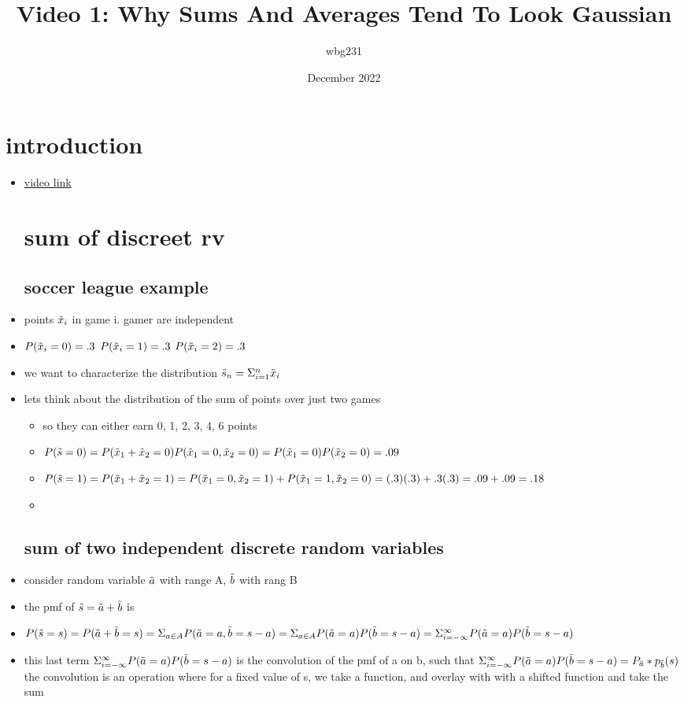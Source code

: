 \documentclass{article}
\title{Video 1: Why Sums And Averages Tend To Look Gaussian}
\author{wbg231 }
\date{December 2022}
\begin{document}
\maketitle

\section{introduction}
\begin{itemize}
\item \href{https://www.youtube.com/watch?v=-fBN9z6uc_E&list=PLBEf5mJtE6KuZ5NBQMuWIMsiOOrV9ibzm&index=70}{video link}
\section{sum of discreet rv}
\subsection{soccer league example}
\item points $\Tilde{x}_i$ in game i. gamer are independent 
\item $P(\Tilde{x}_i=0)=.3$ $P(\Tilde{x}_i=1)=.3$ $P(\Tilde{x}_i=2)=.3$
\item we want to characterize the distribution $\Tilde{s}_{n}=\Sigma_{i=1}^{n}\Tilde{x}_i$
\item lets think about the distribution of the sum of points over just two games
\begin{itemize}
    \item  so they can either earn 0, 1, 2, 3, 4, 6 points
    \item $P(\Tilde{s}=0)=P(\Tilde{x}_1+\Tilde{x}_2=0)P(\Tilde{x}_1=0,\Tilde{x}_2=0)=P(\Tilde{x}_1=0)P(\Tilde{x}_2=0)=.09$
    \item $P(\Tilde{s}=1)=P(\Tilde{x}_{1}+\Tilde{x}_{2}=1)=P(\Tilde{x}_1=0, \Tilde{x}_2=1)+P(\Tilde{x}_1=1, \Tilde{x}_2=0)=(.3)(.3)+.3(.3)=.09+.09=.18$
    \item 
\end{itemize}
\subsection{sum of two independent discrete random variables}
\item consider random variable $\Tilde{a}$ with range A, $\Tilde{b}$ with rang B
\item the pmf of $\Tilde{s}=\Tilde{a}+\Tilde{b}$ is 
\item $P(\Tilde{s}=s)=P(\Tilde{a}+\Tilde{b}=s)=\Sigma_{a\in A}P(\Tilde{a}=a,\Tilde{b}=s-a)=\Sigma_{a\in A}P(\Tilde{a}=a)P(\Tilde{b}=s-a)=\Sigma_{i=-\infty}^{\infty}P(\Tilde{a}=a)P(\Tilde{b}=s-a)$
\item this last term $\Sigma_{i=-\infty}^{\infty}P(\Tilde{a}=a)P(\Tilde{b}=s-a)$ is the convolution of the pmf of a on b, such that $\Sigma_{i=-\infty}^{\infty}P(\Tilde{a}=a)P(\Tilde{b}=s-a)=P_{\Tilde{a}}*p_{\Tilde{b}}(s)$ the convolution is an operation where for a fixed value of s, we take a function, and overlay with with a shifted function and take the sum 

\end{itemize}
\end{document}
